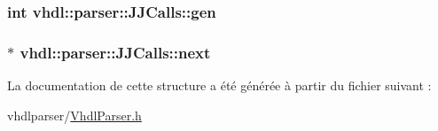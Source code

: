 \subsubsection[{gen}]{\setlength{\rightskip}{0pt plus 5cm}int vhdl\+::parser\+::\+J\+J\+Calls\+::gen}\label{structvhdl_1_1parser_1_1_j_j_calls_a5d25b6278ae014a14a0f5be2678f663c}
\hypertarget{structvhdl_1_1parser_1_1_j_j_calls_a6b6a95b77fab1e71ce05bd43da1b8f67}{}
\subsubsection[{next}]{$\ast$ vhdl\+::parser\+::\+J\+J\+Calls\+::next}\label{structvhdl_1_1parser_1_1_j_j_calls_a6b6a95b77fab1e71ce05bd43da1b8f67}


La documentation de cette structure a été générée à partir du fichier suivant \+:\begin{DoxyCompactItemize}
\item 
vhdlparser/\hyperlink{_vhdl_parser_8h}{Vhdl\+Parser.\+h}\end{DoxyCompactItemize}
